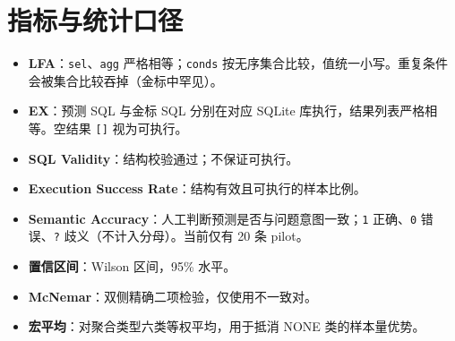 \documentclass[conference]{IEEEtran}
\begin{document}
\section{指标与统计口径}
\begin{itemize}
\item \textbf{LFA}：\texttt{sel}、\texttt{agg} 严格相等；\texttt{conds} 按无序集合比较，值统一小写。重复条件会被集合比较吞掉（金标中罕见）。
\item \textbf{EX}：预测 SQL 与金标 SQL 分别在对应 SQLite 库执行，结果列表严格相等。空结果 \texttt{[]} 视为可执行。
\item \textbf{SQL Validity}：结构校验通过；不保证可执行。
\item \textbf{Execution Success Rate}：结构有效且可执行的样本比例。
\item \textbf{Semantic Accuracy}：人工判断预测是否与问题意图一致；\texttt{1} 正确、\texttt{0} 错误、\texttt{?} 歧义（不计入分母）。当前仅有 20 条 pilot。
\item \textbf{置信区间}：Wilson 区间，95\% 水平。
\item \textbf{McNemar}：双侧精确二项检验，仅使用不一致对。
\item \textbf{宏平均}：对聚合类型六类等权平均，用于抵消 NONE 类的样本量优势。
\end{itemize}
\end{document}

